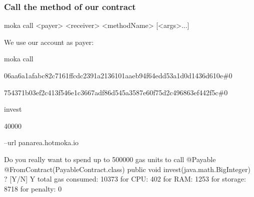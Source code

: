 \documentclass[11pt]{beamer}  %
\def\codesize{\smaller}
\def\<#1>{\codeid{#1}}
\newcommand{\codeid}[1]{\ifmmode{\mbox{\codesize\ttfamily{#1}}}\else{\codesize\ttfamily #1}\fi}
\begin{document}
\begin{frame}[fragile]\frametitle{Call the \<invest> method of our contract}

\begin{tt}
moka call <payer> <receiver> <methodName> [<args>...]
\end{tt}

\medskip

We use our account as payer:

\medskip

\begin{greenbox}{}
 {\color{armygreen}\scriptsize{\begin{tt}
          moka call

          06aa6a1afabc82c7161ffcdc2391a2136101aaeb94f64edd53a1d0d1436d610e\#0

          754371b03ef2c413f546e1c3667adf86d545a3587e60f75d2c496863ef442f5c\#0

          invest

          40000

          --url panarea.hotmoka.io
 \end{tt}}}
 {\tiny\begin{semiverbatim}
Do you really want to spend up to 500000 gas units to call
  {\color{red}@Payable @FromContract(PayableContract.class) public void invest(java.math.BigInteger)} ? [Y/N] Y
{\color{armygreen}total gas consumed: 10373}
{\color{darkred}  for CPU: 402
  for RAM: 1253
  for storage: 8718
  for penalty: 0}
    \end{semiverbatim}}
  \end{greenbox}

\end{frame}
\end{document}
